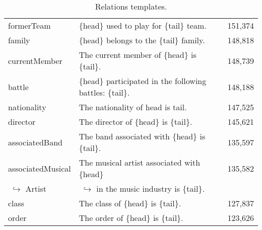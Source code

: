 \begin{table}[t]
{\begin{tabular}{l|l|l}
    formerTeam & \{head\} used to play for \{tail\} team. & 151,374 \\
    family & \{head\} belongs to the \{tail\} family. & 148,818 \\
  currentMember & The current member of \{head\} is \{tail\}. & 148,739 \\
    battle & \{head\} participated in the following battles: \{tail\}. & 148,188 \\
    nationality &  The nationality of {head} is {tail}. & 147,525 \\ 
    director & The director of \{head\} is \{tail\}. & 145,621 \\
    associatedBand & The band associated with \{head\} is \{tail\}. & 135,597 \\
    associatedMusical& The musical artist associated with \{head\}   & 135,582 
    \\$\;\hookrightarrow$ Artist &$\;\hookrightarrow$  in the music industry is \{tail\}. & \\
    class & The class of \{head\} is \{tail\}. & 127,837 \\
    order & The order of \{head\} is \{tail\}. & 123,626 \\
    \bottomrule
    \end{tabular}}
    \caption{Relations templates.}
\label{tab:relation_templates}
\end{table}
